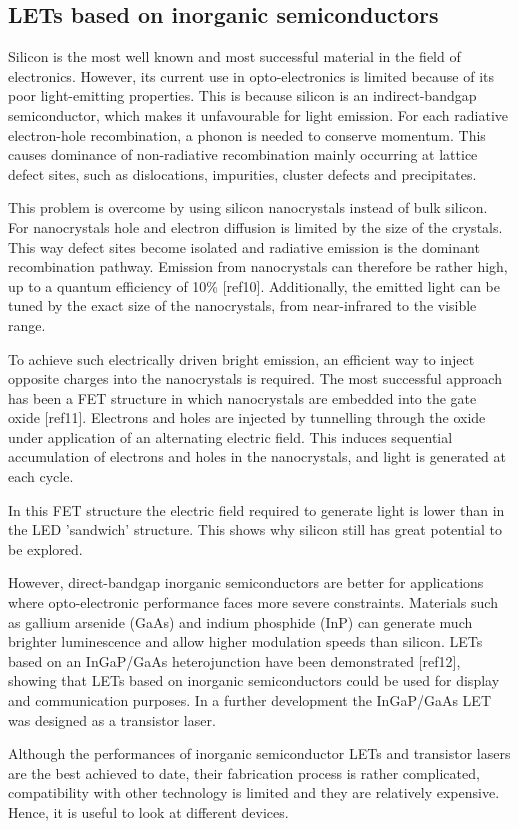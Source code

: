 \subsection{LETs based on inorganic semiconductors} %

Silicon is the most well known and most successful material in the field of electronics. However, its current use in opto-electronics is limited because of its poor light-emitting properties. This is because silicon is an indirect-bandgap semiconductor, which makes it unfavourable for light emission. For each radiative electron-hole recombination, a phonon is needed to conserve momentum. This causes dominance of non-radiative recombination mainly occurring at lattice defect sites, such as dislocations, impurities, cluster defects and precipitates.

This problem is overcome by using silicon nanocrystals instead of bulk silicon. For nanocrystals hole and electron diffusion is limited by the size of the crystals. This way defect sites become isolated and radiative emission is the dominant recombination pathway. Emission from nanocrystals can therefore be rather high, up to a quantum efficiency of  10\% [ref10]. Additionally, the emitted light can be tuned by the exact size of the nanocrystals, from near-infrared to the visible range. 

To achieve such electrically driven bright emission, an efficient way to inject opposite charges into the nanocrystals is required. The most successful approach has been a FET structure in which nanocrystals are embedded into the gate oxide [ref11]. Electrons and holes are injected by tunnelling through the oxide under application of an alternating electric field. This induces sequential accumulation of electrons and holes in the nanocrystals, and light is generated at each cycle.

In this FET structure the electric field required to generate light is lower than in the LED 'sandwich' structure. This shows why silicon still has great potential to be explored.

However, direct-bandgap inorganic semiconductors are better for applications where opto-electronic performance faces more severe constraints. Materials such as gallium arsenide (GaAs) and indium phosphide (InP) can generate much brighter luminescence and allow higher modulation speeds than silicon. LETs based on an InGaP/GaAs heterojunction have been demonstrated [ref12], showing that LETs based on inorganic semiconductors could be used for display and communication purposes. In a further development the InGaP/GaAs LET was designed as a transistor laser.

Although the performances of inorganic semiconductor LETs and transistor lasers are the best achieved to date, their fabrication process is rather complicated, compatibility with other technology is limited and they are relatively expensive. Hence, it is useful to look at different devices.
